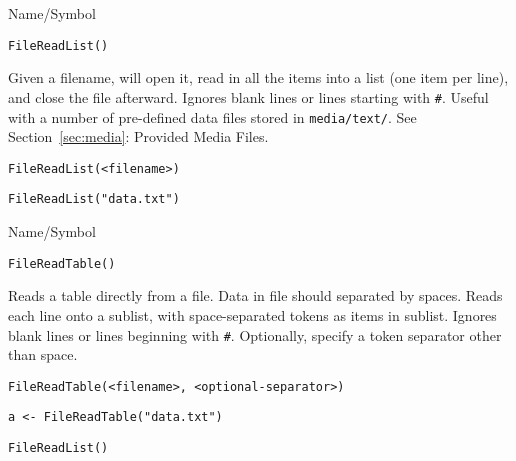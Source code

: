 \rl




\begin{desc}{Name/Symbol}
\item[Name/Symbol]  	\verb+FileReadList()+
 
\item[Description] Given a filename, will open it, read in all the
  items into a list (one item per line), and close the file afterward.
  Ignores blank lines or lines starting with \verb+#+.  Useful with a
  number of pre-defined data files stored in \verb+media/text/+.  See
  Section~\ref{sec:media}: Provided Media Files.

\item[Usage]
\begin{verbatim}
FileReadList(<filename>)
\end{verbatim}

\item[Example]
\begin{verbatim}
FileReadList("data.txt")
\end{verbatim}

\item[See Also]
\end{desc}

\rl


\begin{desc}{Name/Symbol}
\item[Name/Symbol]	\verb+FileReadTable()+

\item[Description]	Reads a table directly from a file. Data in file should
		separated by spaces.  Reads each line onto a sublist,
		with space-separated tokens as items in sublist.  Ignores
		blank lines or lines beginning with \verb+#+. Optionally,
		specify a token separator other than space.

\item[Usage]
\begin{verbatim}
FileReadTable(<filename>, <optional-separator>)
\end{verbatim}

\item[Example]
\begin{verbatim}
a <- FileReadTable("data.txt")
\end{verbatim}

\item[See Also]	\verb+FileReadList()+
\end{desc}

\rl





